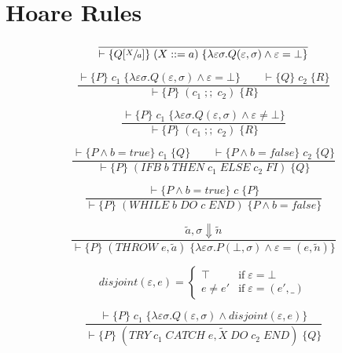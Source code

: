 \section{Hoare Rules}

\begin{equation}
\frac{}{\vdash \{Q[\sfrac{X}{a}]\} \; (X ::= a) \; \{\lambda \varepsilon \sigma. Q(\varepsilon, \sigma) \wedge \varepsilon = \bot\}}
\end{equation}

\begin{equation}
\frac{\vdash \{P\} \; c_1 \; \{\lambda \varepsilon \sigma. Q(\varepsilon, \sigma) \wedge \varepsilon = \bot\} \qquad \vdash \{Q\} \; c_2 \; \{R\}}{\vdash \{P\} \; (c_1\; ;;\; c_2) \; \{R\}}
\end{equation}

\begin{equation}
\frac{\vdash \{P\} \; c_1 \; \{\lambda \varepsilon \sigma. Q(\varepsilon, \sigma) \wedge \varepsilon \neq \bot\}}{\vdash \{P\} \; (c_1\; ;;\; c_2) \; \{R\}}
\end{equation}

\begin{equation}
\frac{\vdash \{P \wedge b=true\} \; c_1 \; \{Q\} \qquad \vdash \{P \wedge b=false\} \; c_2 \; \{Q\}}{\vdash \{P\} \; (IFB\; b\; THEN\; c_1\; ELSE\; c_2\; FI) \; \{Q\}}
\end{equation}

\begin{equation}
\frac{\vdash \{P \wedge b = true\} \; c \; \{P\}}{\vdash \{P\} \; (WHILE\; b\; DO\; c\; END) \; \{P \wedge b = false\}}
\end{equation}

\begin{equation}
\frac{\tilde{a}, \sigma \Downarrow \tilde{n}}{\vdash \{P\} \; (THROW\; e, \tilde{a}) \; \{\lambda \varepsilon \sigma. P (\bot, \sigma) \wedge \varepsilon = (e, \tilde{n})\}}
\end{equation}

\begin{equation}
disjoint(\varepsilon, e) = \begin{cases}
\top & \mbox{if} \; \varepsilon = \bot \\
e \neq e' & \mbox{if} \; \varepsilon = (e', \_)
\end{cases}
\end{equation}

\begin{equation}
\frac{\vdash \{P\} \; c_1 \; \{\lambda \varepsilon \sigma. Q(\varepsilon, \sigma) \wedge disjoint(\varepsilon, e)\}}{\vdash \{P\} \; (TRY\; c_1\; CATCH\; e, \tilde{X}\; DO\; c_2\; END) \; \{Q\}}
\end{equation}

